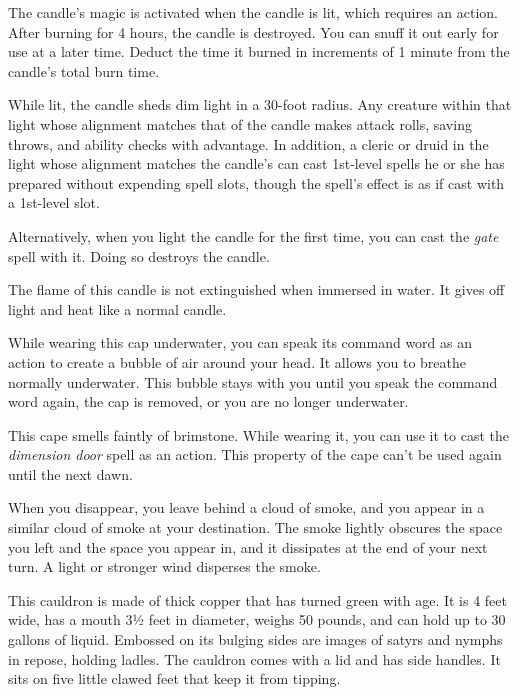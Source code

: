 \documentclass[10pt,a4paper,twoside,bg=print,twocolumn,openany,nodeprecatedcode]{dndbook}
\begin{document}
The candle's magic is activated when the candle is lit, which requires an action. After burning for 4 hours, the candle is destroyed. You can snuff it out early for use at a later time. Deduct the time it burned in increments of 1 minute from the candle's total burn time.

While lit, the candle sheds dim light in a 30-foot radius. Any creature within that light whose alignment matches that of the candle makes attack rolls, saving throws, and ability checks with advantage. In addition, a cleric or druid in the light whose alignment matches the candle's can cast 1st-level spells he or she has prepared without expending spell slots, though the spell's effect is as if cast with a 1st-level slot.

Alternatively, when you light the candle for the first time, you can cast the \textit{gate} spell with it. Doing so destroys the candle.

The flame of this candle is not extinguished when immersed in water. It gives off light and heat like a normal candle.

While wearing this cap underwater, you can speak its command word as an action to create a bubble of air around your head. It allows you to breathe normally underwater. This bubble stays with you until you speak the command word again, the cap is removed, or you are no longer underwater.

This cape smells faintly of brimstone. While wearing it, you can use it to cast the \textit{dimension door} spell as an action. This property of the cape can't be used again until the next dawn.

When you disappear, you leave behind a cloud of smoke, and you appear in a similar cloud of smoke at your destination. The smoke lightly obscures the space you left and the space you appear in, and it dissipates at the end of your next turn. A light or stronger wind disperses the smoke.

This cauldron is made of thick copper that has turned green with age. It is 4 feet wide, has a mouth 3½ feet in diameter, weighs 50 pounds, and can hold up to 30 gallons of liquid. Embossed on its bulging sides are images of satyrs and nymphs in repose, holding ladles. The cauldron comes with a lid and has side handles. It sits on five little clawed feet that keep it from tipping.
\end{document}
